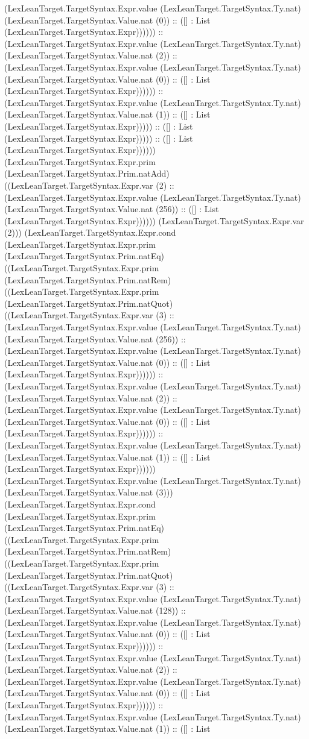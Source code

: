 \documentclass[11pt]{article}
\begin{document}
(LexLeanTarget.TargetSyntax.Expr.value (LexLeanTarget.TargetSyntax.Ty.nat) (LexLeanTarget.TargetSyntax.Value.nat (0)) :: ([] : List (LexLeanTarget.TargetSyntax.Expr)))))) :: (LexLeanTarget.TargetSyntax.Expr.value (LexLeanTarget.TargetSyntax.Ty.nat) (LexLeanTarget.TargetSyntax.Value.nat (2)) :: (LexLeanTarget.TargetSyntax.Expr.value (LexLeanTarget.TargetSyntax.Ty.nat) (LexLeanTarget.TargetSyntax.Value.nat (0)) :: ([] : List (LexLeanTarget.TargetSyntax.Expr)))))) :: (LexLeanTarget.TargetSyntax.Expr.value (LexLeanTarget.TargetSyntax.Ty.nat) (LexLeanTarget.TargetSyntax.Value.nat (1)) :: ([] : List (LexLeanTarget.TargetSyntax.Expr))))) :: ([] : List (LexLeanTarget.TargetSyntax.Expr))))) :: ([] : List (LexLeanTarget.TargetSyntax.Expr)))))) (LexLeanTarget.TargetSyntax.Expr.prim (LexLeanTarget.TargetSyntax.Prim.natAdd) ((LexLeanTarget.TargetSyntax.Expr.var (2) :: (LexLeanTarget.TargetSyntax.Expr.value (LexLeanTarget.TargetSyntax.Ty.nat) (LexLeanTarget.TargetSyntax.Value.nat (256)) :: ([] : List (LexLeanTarget.TargetSyntax.Expr)))))) (LexLeanTarget.TargetSyntax.Expr.var (2))) (LexLeanTarget.TargetSyntax.Expr.cond (LexLeanTarget.TargetSyntax.Expr.prim (LexLeanTarget.TargetSyntax.Prim.natEq) ((LexLeanTarget.TargetSyntax.Expr.prim (LexLeanTarget.TargetSyntax.Prim.natRem) ((LexLeanTarget.TargetSyntax.Expr.prim (LexLeanTarget.TargetSyntax.Prim.natQuot) ((LexLeanTarget.TargetSyntax.Expr.var (3) :: (LexLeanTarget.TargetSyntax.Expr.value (LexLeanTarget.TargetSyntax.Ty.nat) (LexLeanTarget.TargetSyntax.Value.nat (256)) :: (LexLeanTarget.TargetSyntax.Expr.value (LexLeanTarget.TargetSyntax.Ty.nat) (LexLeanTarget.TargetSyntax.Value.nat (0)) :: ([] : List (LexLeanTarget.TargetSyntax.Expr)))))) :: (LexLeanTarget.TargetSyntax.Expr.value (LexLeanTarget.TargetSyntax.Ty.nat) (LexLeanTarget.TargetSyntax.Value.nat (2)) :: (LexLeanTarget.TargetSyntax.Expr.value (LexLeanTarget.TargetSyntax.Ty.nat) (LexLeanTarget.TargetSyntax.Value.nat (0)) :: ([] : List (LexLeanTarget.TargetSyntax.Expr)))))) :: (LexLeanTarget.TargetSyntax.Expr.value (LexLeanTarget.TargetSyntax.Ty.nat) (LexLeanTarget.TargetSyntax.Value.nat (1)) :: ([] : List (LexLeanTarget.TargetSyntax.Expr)))))) (LexLeanTarget.TargetSyntax.Expr.value (LexLeanTarget.TargetSyntax.Ty.nat) (LexLeanTarget.TargetSyntax.Value.nat (3))) (LexLeanTarget.TargetSyntax.Expr.cond (LexLeanTarget.TargetSyntax.Expr.prim (LexLeanTarget.TargetSyntax.Prim.natEq) ((LexLeanTarget.TargetSyntax.Expr.prim (LexLeanTarget.TargetSyntax.Prim.natRem) ((LexLeanTarget.TargetSyntax.Expr.prim (LexLeanTarget.TargetSyntax.Prim.natQuot) ((LexLeanTarget.TargetSyntax.Expr.var (3) :: (LexLeanTarget.TargetSyntax.Expr.value (LexLeanTarget.TargetSyntax.Ty.nat) (LexLeanTarget.TargetSyntax.Value.nat (128)) :: (LexLeanTarget.TargetSyntax.Expr.value (LexLeanTarget.TargetSyntax.Ty.nat) (LexLeanTarget.TargetSyntax.Value.nat (0)) :: ([] : List (LexLeanTarget.TargetSyntax.Expr)))))) :: (LexLeanTarget.TargetSyntax.Expr.value (LexLeanTarget.TargetSyntax.Ty.nat) (LexLeanTarget.TargetSyntax.Value.nat (2)) :: (LexLeanTarget.TargetSyntax.Expr.value (LexLeanTarget.TargetSyntax.Ty.nat) (LexLeanTarget.TargetSyntax.Value.nat (0)) :: ([] : List (LexLeanTarget.TargetSyntax.Expr)))))) :: (LexLeanTarget.TargetSyntax.Expr.value (LexLeanTarget.TargetSyntax.Ty.nat) (LexLeanTarget.TargetSyntax.Value.nat (1)) :: ([] : List 
\end{document}
